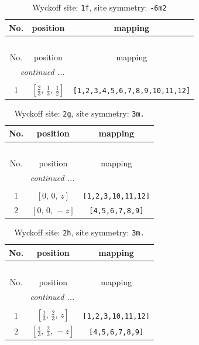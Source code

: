 \documentclass[fleqn,8pt]{jsarticle}
\begin{document}
\renewcommand{\arraystretch}{1.2}
\begin{longtable}{ccc}
\caption{Wyckoff site: {\tt 1f}, site symmetry: {\tt -6m2}}
 \\
 \hline \hline
No. & position & mapping \\ \hline \endfirsthead

\multicolumn{2}{l}{\tablename\ \thetable{}} \\
 \hline \hline
No. & position & mapping \\ \hline \endhead

 \hline \hline
\multicolumn{2}{r}{\footnotesize\it continued ...} \\ \endfoot

 \hline \hline
\multicolumn{2}{r}{} \\ \endlastfoot

1 & $\left[ \frac{2}{3},\, \frac{1}{3},\, \frac{1}{2} \right]$ & {\tt [1,2,3,4,5,6,7,8,9,10,11,12]} \\
\end{longtable}
\renewcommand{\arraystretch}{1.2}
\begin{longtable}{ccc}
\caption{Wyckoff site: {\tt 2g}, site symmetry: {\tt 3m.}}
 \\
 \hline \hline
No. & position & mapping \\ \hline \endfirsthead

\multicolumn{2}{l}{\tablename\ \thetable{}} \\
 \hline \hline
No. & position & mapping \\ \hline \endhead

 \hline \hline
\multicolumn{2}{r}{\footnotesize\it continued ...} \\ \endfoot

 \hline \hline
\multicolumn{2}{r}{} \\ \endlastfoot

1 & $\left[ 0,\, 0,\, z \right]$ & {\tt [1,2,3,10,11,12]} \\ \hline
2 & $\left[ 0,\, 0,\, - z \right]$ & {\tt [4,5,6,7,8,9]} \\
\end{longtable}
\renewcommand{\arraystretch}{1.2}
\begin{longtable}{ccc}
\caption{Wyckoff site: {\tt 2h}, site symmetry: {\tt 3m.}}
 \\
 \hline \hline
No. & position & mapping \\ \hline \endfirsthead

\multicolumn{2}{l}{\tablename\ \thetable{}} \\
 \hline \hline
No. & position & mapping \\ \hline \endhead

 \hline \hline
\multicolumn{2}{r}{\footnotesize\it continued ...} \\ \endfoot

 \hline \hline
\multicolumn{2}{r}{} \\ \endlastfoot

1 & $\left[ \frac{1}{3},\, \frac{2}{3},\, z \right]$ & {\tt [1,2,3,10,11,12]} \\ \hline
2 & $\left[ \frac{1}{3},\, \frac{2}{3},\, - z \right]$ & {\tt [4,5,6,7,8,9]} \\
\end{longtable}
\end{document}
